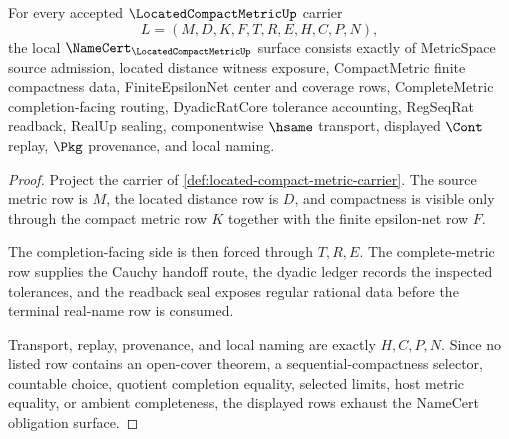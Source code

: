 \begin{theorem}
\label{thm:located-compact-metric-namecert-obligations}
For every accepted $\LocatedCompactMetricUp$ carrier
$$
L=(M,D,K,F,T,R,E,H,C,P,N),
$$
the local $\NameCert_{\LocatedCompactMetricUp}$ surface consists exactly of MetricSpace source admission, located distance witness exposure, CompactMetric finite compactness data, FiniteEpsilonNet center and coverage rows, CompleteMetric completion-facing routing, DyadicRatCore tolerance accounting, RegSeqRat readback, RealUp sealing, componentwise $\hsame$ transport, displayed $\Cont$ replay, $\Pkg$ provenance, and local naming.
\end{theorem}
\begin{proof}
Project the carrier of \autoref{def:located-compact-metric-carrier}. The source metric row is $M$, the located distance row is $D$, and compactness is visible only through the compact metric row $K$ together with the finite epsilon-net row $F$.

The completion-facing side is then forced through $T,R,E$. The complete-metric row supplies the Cauchy handoff route, the dyadic ledger records the inspected tolerances, and the readback seal exposes regular rational data before the terminal real-name row is consumed.

Transport, replay, provenance, and local naming are exactly $H,C,P,N$. Since no listed row contains an open-cover theorem, a sequential-compactness selector, countable choice, quotient completion equality, selected limits, host metric equality, or ambient completeness, the displayed rows exhaust the NameCert obligation surface.
\end{proof}

